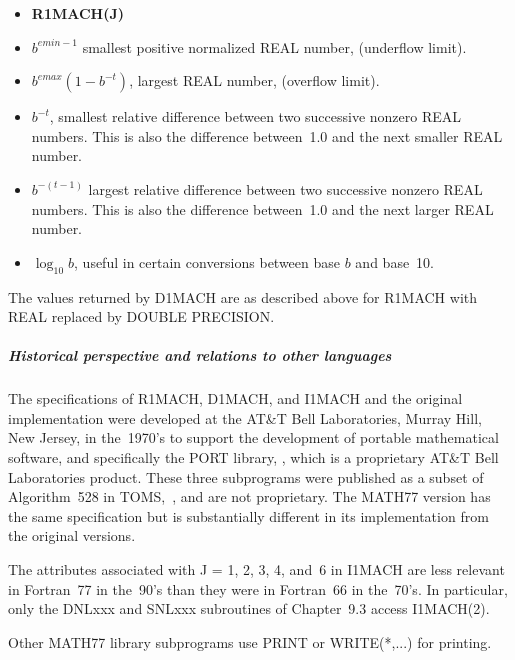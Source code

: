 \documentclass[twoside]{MATH77}
\begin{document}
\begin{itemize}
\item[\bf J]  {\hspace{.5in} {\bf R1MACH(J)}}
\item[1]  $b^{emin-1}$ smallest positive normalized REAL number,
(underflow limit).
\item[2]  $b^{emax}(1-b^{-t})$, largest REAL number, (overflow limit).
\item[3]  $b^{-t}$, smallest relative difference between two successive
nonzero REAL numbers. This is also the difference between~1.0 and the next
smaller REAL number.
\item[4]  $b^{-(t-1)}$ largest relative difference between two successive
nonzero REAL numbers. This is also the difference between~1.0 and the next
larger REAL number.
\item[5]  $\log _{10}b$, useful in certain conversions between base $b$ and
base~10.
\end{itemize}
The values returned by D1MACH are as described above for R1MACH with REAL
replaced by DOUBLE PRECISION.

\subparagraph{Historical perspective and relations to other languages}

The specifications of R1MACH, D1MACH, and I1MACH and the original
implementation were developed at the AT\&T Bell Laboratories, Murray Hill,
New Jersey, in the~1970's to support the development of portable
mathematical software, and specifically the PORT library,
\cite{Fox:1978:PMS}, which is a proprietary AT\&T Bell Laboratories
product.  These three subprograms were published as a subset of
Algorithm~528 in TOMS,~\cite{Fox:1978:AFP}, and are not proprietary.  The
MATH77 version has the same specification but is substantially different
in its implementation from the original versions.

The attributes associated with J = 1, 2, 3, 4, and~6 in I1MACH are less
relevant in Fortran~77 in the~90's than they were in Fortran~66 in the~70's.
In particular, only the DNLxxx and SNLxxx subroutines of
Chapter~9.3 access I1MACH(2).

Other MATH77 library subprograms use PRINT or WRITE(*,...) for printing.
\end{document}
